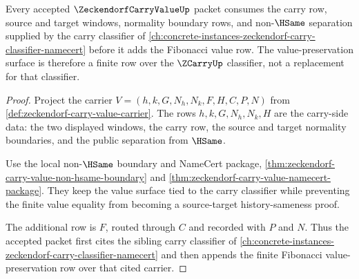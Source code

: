 \begin{theorem}
\label{thm:zeckendorf-carry-value-classifier-dependency}
Every accepted $\ZeckendorfCarryValueUp$ packet consumes the carry row, source and target windows, normality boundary rows, and non-$\HSame$ separation supplied by the carry classifier of \autoref{ch:concrete-instances-zeckendorf-carry-classifier-namecert} before it adds the Fibonacci value row. The value-preservation surface is therefore a finite row over the $\ZCarryUp$ classifier, not a replacement for that classifier.
\end{theorem}
\begin{proof}
Project the carrier $V=(h,k,G,N_h,N_k,F,H,C,P,N)$ from \autoref{def:zeckendorf-carry-value-carrier}. The rows $h,k,G,N_h,N_k,H$ are the carry-side data: the two displayed windows, the carry row, the source and target normality boundaries, and the public separation from $\HSame$.

Use the local non-$\HSame$ boundary and NameCert package, \autoref{thm:zeckendorf-carry-value-non-hsame-boundary} and \autoref{thm:zeckendorf-carry-value-namecert-package}. They keep the value surface tied to the carry classifier while preventing the finite value equality from becoming a source-target history-sameness proof.

The additional row is $F$, routed through $C$ and recorded with $P$ and $N$. Thus the accepted packet first cites the sibling carry classifier of \autoref{ch:concrete-instances-zeckendorf-carry-classifier-namecert} and then appends the finite Fibonacci value-preservation row over that cited carrier.
\end{proof}

